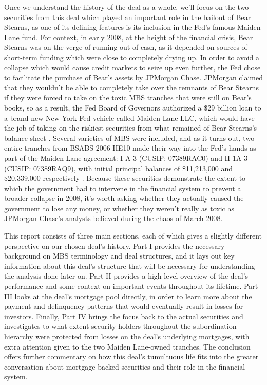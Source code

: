 \documentclass[12pt]{article}
\begin{document}
Once we understand the history of the deal as a whole, we’ll focus on the two securities from this deal which played an important role in the bailout of Bear Stearns, as one of its defining features is its inclusion in the Fed’s famous Maiden Lane fund. For context, in early 2008, at the height of the financial crisis, Bear Stearns was on the verge of running out of cash, as it depended on sources of short-term funding which were close to completely drying up. In order to avoid a collapse which would cause credit markets to seize up even further, the Fed chose to facilitate the purchase of Bear’s assets by JPMorgan Chase. JPMorgan claimed that they wouldn’t be able to completely take over the remnants of Bear Stearns if they were forced to take on the toxic MBS tranches that were still on Bear’s books, so as a result, the Fed Board of Governors authorized a \$29 billion loan to a brand-new New York Fed vehicle called Maiden Lane LLC, which would have the job of taking on the riskiest securities from what remained of Bear Stearns’s balance sheet \parencite{fcic09}. Several varieties of MBS were included, and as it turns out, two entire tranches from BSABS 2006-HE10 made their way into the Fed’s hands as part of the Maiden Lane agreement: I-A-3 (CUSIP: 07389RAC0) and II-1A-3 (CUSIP: 07389RAQ9), with initial principal balances of \$11,213,000 and \$20,339,000 respectively \parencite{fcic09}. Because these securities demonstrate the extent to which the government had to intervene in the financial system to prevent a broader collapse in 2008, it’s worth asking whether they actually caused the government to lose any money, or whether they weren’t really as toxic as JPMorgan Chase’s analysts believed during the chaos of March 2008.

This report consists of three main sections, each of which gives a slightly different perspective on our chosen deal’s history. Part I provides the necessary background on MBS terminology and deal structures, and it lays out key information about this deal’s structure that will be necessary for understanding the analysis done later on. Part II provides a high-level overview of the deal’s performance and some context on important events throughout its lifetime. Part III looks at the deal’s mortgage pool directly, in order to learn more about the payment and delinquency patterns that would eventually result in losses for investors. Finally, Part IV brings the focus back to the actual securities and investigates to what extent security holders throughout the subordination hierarchy were protected from losses on the deal’s underlying mortgages, with extra attention given to the two Maiden Lane-owned tranches. The conclusion offers further commentary on how this deal’s tumultuous life fits into the greater conversation about mortgage-backed securities and their role in the financial system.
\end{document}
